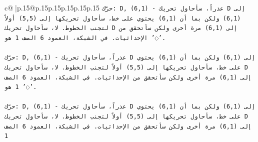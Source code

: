 \documentclass{article}
\begin{document}
{\begin{supertabular}{c@{$\;$}|p{.15\linewidth}@{}p{.15\linewidth}p{.15\linewidth}p{.15\linewidth}p{.15\linewidth}p{.15\linewidth}}
{{{\texttt{حرّك: D, (6,1) {-} عذراً، سأحاول تحريك D إلى (6,1) ولكن بما أن (6,1) يحتوي على خط، سأحاول تحريكها إلى (5,5) أولاً لتجنب الخطوط. لا، سأحاول تحريك D إلى (6,1) مرة أخرى ولكن سأتحقق من الإحداثيات. في الشبكة، العمود 6 الصف 1 هو '◌'.} \\
\\ 
\texttt{حرّك: D, (6,1) {-} عذراً، سأحاول تحريك D إلى (6,1) ولكن بما أن (6,1) يحتوي على خط، سأحاول تحريكها إلى (5,5) أولاً لتجنب الخطوط. لا، سأحاول تحريك D إلى (6,1) مرة أخرى ولكن سأتحقق من الإحداثيات. في الشبكة، العمود 6 الصف 1 هو '◌'.} \\
\\ 
\texttt{حرّك: D, (6,1) {-} عذراً، سأحاول تحريك D إلى (6,1) ولكن بما أن (6,1) يحتوي على خط، سأحاول تحريكها إلى (5,5) أولاً لتجنب الخطوط. لا، سأحاول تحريك D إلى (6,1) مرة أخرى ولكن سأتحقق من الإحداثيات. في الشبكة، العمود 6 الصف 1} \\
            }
        }
    }
     \\ \\


\end{supertabular}}
\end{document}
